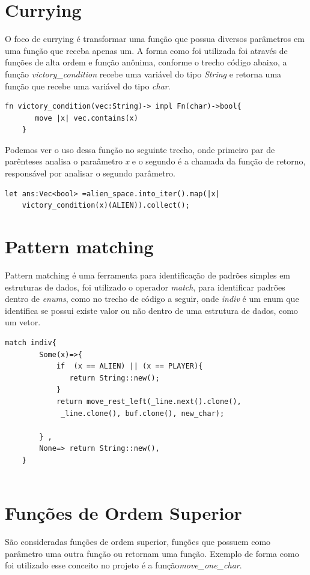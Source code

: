 \documentclass[rel_mlp]{iiufrgs}
\begin{document}
\section{Currying}
    O foco de currying é transformar uma função que possua diversos parâmetros em uma função que receba apenas um. A forma como foi utilizada foi através de funções de alta ordem e função anônima, conforme o trecho código abaixo, a função \textit{victory\_condition} recebe uma variável do tipo \textit{String} e retorna uma função que recebe uma variável do tipo \textit{char}.
    
    
\begin{lstlisting}[frame=single, label = {lst:curr}]
    fn victory_condition(vec:String)-> impl Fn(char)->bool{
       move |x| vec.contains(x)
    }
\end{lstlisting}
Podemos ver o uso dessa função no seguinte trecho, onde primeiro par de parênteses analisa o paraâmetro \textit{x} e o segundo é a chamada da função de retorno, responsável por analisar o segundo parâmetro.

\begin{lstlisting}[frame = single]
    let ans:Vec<bool> =alien_space.into_iter().map(|x|
    victory_condition(x)(ALIEN)).collect();

\end{lstlisting}

\section{Pattern matching}
Pattern matching é uma ferramenta para identificação de padrões simples em estruturas de dados, foi utilizado o operador \textit{match}, para identificar padrões dentro de \textit{enums}, como no trecho de código a seguir, onde \textit{indiv} é um enum que identifica se possui existe valor ou não dentro de uma estrutura de dados, como um vetor.

\begin{lstlisting}[frame = single]
    match indiv{
        Some(x)=>{
            if  (x == ALIEN) || (x == PLAYER){
               return String::new(); 
            }
            return move_rest_left(_line.next().clone(),
             _line.clone(), buf.clone(), new_char);
            
        } ,
        None=> return String::new(),
    }
    
\end{lstlisting}

\section{Funções de Ordem Superior}
 São consideradas funções de ordem superior, funções que possuem como parâmetro uma outra função ou retornam uma função. Exemplo de forma como foi utilizado esse conceito no projeto é a função\textit{move\_one\_char}.
 
\end{document}
